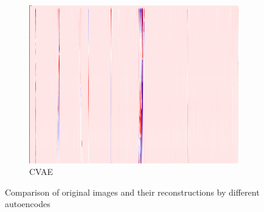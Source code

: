 \begin{figure}[h]
\begin{subfigure}{0.33\textwidth}
        \includegraphics[width=\textwidth]{figures/test.png}
        \caption{CVAE}
    \end{subfigure}
    
    \caption{Comparison of original images and their reconstructions by different autoencodes}
    \label{fig:aereconstruct}
\end{figure}